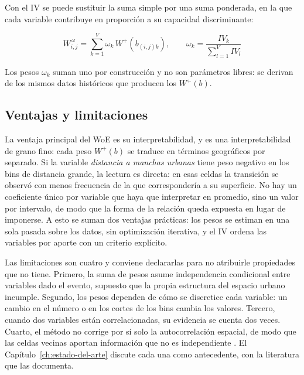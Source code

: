 
Con el IV se puede sustituir la suma simple por una suma ponderada, en la que cada variable contribuye en proporción a su capacidad discriminante:

\begin{equation}
W^{\,\omega}_{i,j} = \sum_{k=1}^{V} \omega_k \, W^+(b_{(i,j)k}), \qquad \omega_k = \frac{IV_k}{\sum_{l=1}^{V} IV_l}
\label{eq:woe_ponderado}
\end{equation}

Los pesos $\omega_k$ suman uno por construcción y no son parámetros libres: se derivan de los mismos datos históricos que producen los $W^+(b)$.


\subsection{Ventajas y limitaciones}

La ventaja principal del WoE es su interpretabilidad, y es una interpretabilidad de grano fino: cada peso $W^+(b)$ se traduce en términos geográficos por separado. Si la variable \textit{distancia a manchas urbanas} tiene peso negativo en los bins de distancia grande, la lectura es directa: en esas celdas la transición se observó con menos frecuencia de la que correspondería a su superficie. No hay un coeficiente único por variable que haya que interpretar en promedio, sino un valor por intervalo, de modo que la forma de la relación queda expuesta en lugar de imponerse. A esto se suman dos ventajas prácticas: los pesos se estiman en una sola pasada sobre los datos, sin optimización iterativa, y el IV ordena las variables por aporte con un criterio explícito.

Las limitaciones son cuatro y conviene declararlas para no atribuirle propiedades que no tiene. Primero, la suma de pesos asume independencia condicional entre variables dado el evento, supuesto que la propia estructura del espacio urbano incumple. Segundo, los pesos dependen de cómo se discretice cada variable: un cambio en el número o en los cortes de los bins cambia los valores. Tercero, cuando dos variables están correlacionadas, su evidencia se cuenta dos veces. Cuarto, el método no corrige por sí solo la autocorrelación espacial, de modo que las celdas vecinas aportan información que no es independiente \parencite{Legendre1993,Brenning2012}. El Capítulo~\ref{ch:estado-del-arte} discute cada una como antecedente, con la literatura que las documenta.

